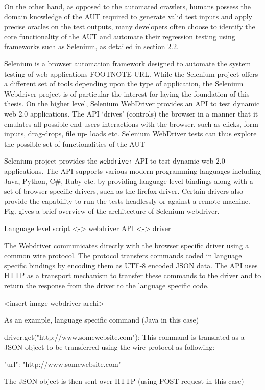 On the other hand, as opposed to the automated crawlers, humans possess the domain knowledge of the AUT required to generate valid test inputs and apply precise oracles on the test outputs, many developers often choose to identify the core functionality of the AUT and automate their regression testing using frameworks such as  Selenium, as detailed in section 2.2.

Selenium is a browser automation framework designed to automate the system testing of web applications FOOTNOTE-URL. While the Selenium project offers a different set of tools depending upon the type of application, the Selenium Webdriver project is of particular the interest for laying the foundation of this thesis. On the higher level, Selenium WebDriver provides an API to test dynamic web 2.0 applications. The API ‘drives’ (controls) the browser in a manner that it emulates all possible end users interactions with the browser, such as clicks, form-inputs, drag-drops, file up- loads etc. Selenium WebDriver tests can thus explore the possible set of functionalities of the AUT 

Selenium project provides the \texttt{webdriver} API to test dynamic web 2.0 applications. The API supports various modern programming languages including Java, Python, C\#, Ruby etc. by providing language level bindings along with a set of browser specific drivers, such as the firefox driver. Certain drivers also provide the capability to run the tests headlessly or against a remote machine. Fig. gives a brief overview of the architecture of Selenium webdriver. 

Language level script <-> webdriver API <-> driver

The Webdriver communicates directly with the browser specific driver using a common wire protocol. The protocol transfers commands coded in language specific bindings by encoding them as UTF-8 encoded JSON data. The API uses  HTTP as a transport mechanism to transfer these commands to the driver and to return the response from the driver to the language specific code. 

<insert image webdriver archi>

As an example, 
language specific command (Java in this case) 

driver.get("http://www.somewebsite.com");
This command is translated as a JSON object to be transferred using the wire protocol as following: 

{"url": "http://www.somewebsite.com" }

The JSON object is then sent over HTTP (using POST request in this case)

